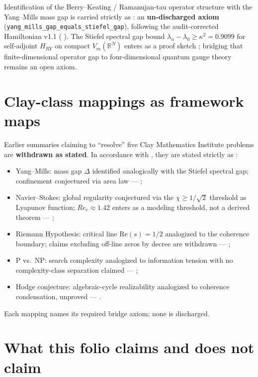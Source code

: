 \documentclass{alienfolio}
\begin{document}
Identification of the Berry--Keating / Ramanujan-tau operator structure
with the Yang--Mills mass gap is carried strictly as :
an \textbf{un-discharged axiom}
(\texttt{yang\_\allowbreak mills\_\allowbreak gap\_\allowbreak equals\_\allowbreak stiefel\_\allowbreak gap}),
following the audit-corrected Hamiltonian v1.1
( \cite{ryh11}). The Stiefel spectral gap
bound $\lambda_n - \lambda_0 \ge \kappa^2 = 0.9099$ for self-adjoint
$H_{RY}$ on compact $V_m(\mathbb{R}^N)$ enters as a proof sketch
; bridging that finite-dimensional operator gap to
four-dimensional quantum gauge theory remains an open axiom.

\section{Clay-class mappings as framework maps}
\label{sec:clay}

Earlier summaries claiming to ``resolve'' five Clay Mathematics Institute
problems are \textbf{withdrawn as stated}. In accordance with
\cite{arsmagna}, they are stated strictly as :
\begin{itemize}
\item Yang--Mills: mass gap $\Delta$ identified analogically with the
Stiefel spectral gap; confinement conjectured via area law ---
;
\item Navier--Stokes: global regularity conjectured via the
$\chi \ge 1/\sqrt{2}$ threshold as Lyapunov function; $Re_c \approx 1.42$
enters as a modeling threshold, not a derived theorem ---
;
\item Riemann Hypothesis: critical line $\mathrm{Re}(s)=1/2$ analogized
to the coherence boundary; claims excluding off-line zeros by decree are
withdrawn --- ;
\item P vs.\ NP: search complexity analogized to information tension
with no complexity-class separation claimed --- ;
\item Hodge conjecture: algebraic-cycle realizability analogized to
coherence condensation, unproved --- .
\end{itemize}
Each mapping names its required bridge axiom; none is discharged.

\section{What this folio claims and does not claim}
\end{document}
